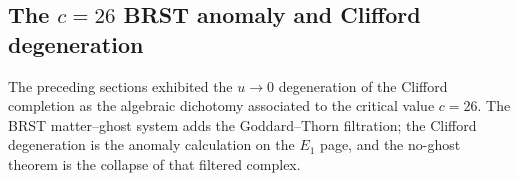 
\subsection{The $c=26$ BRST anomaly and Clifford degeneration}
\label{sec:critical-string-clifford-degeneration}

The preceding sections exhibited the $u\to 0$ degeneration of the
Clifford completion as the algebraic dichotomy associated to the
critical value $c=26$. The BRST matter--ghost system adds the
Goddard--Thorn filtration; the Clifford degeneration is the anomaly
calculation on the $E_1$ page, and the no-ghost theorem is the
collapse of that filtered complex.

